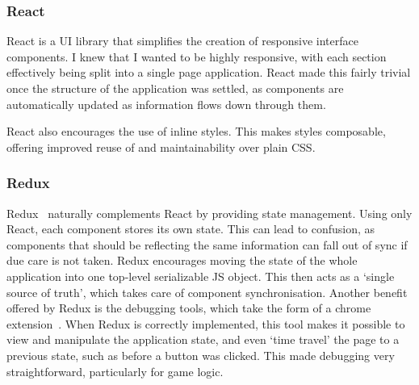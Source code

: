 \subsubsection{React}
React\cite{React} is a UI library that simplifies the creation of responsive interface components. I knew that I wanted \od{} to be highly responsive, with each section effectively being split into a single page application. React made this fairly trivial once the structure of the application was settled, as components are automatically updated as information flows down through them.

React also encourages the use of inline styles. This makes styles composable, offering improved reuse of and maintainability over plain CSS.

\subsubsection{Redux}
Redux~\cite{Redux} naturally complements React by providing state management. Using only React, each component stores its own state. This can lead to confusion, as components that should be reflecting the same information can fall out of sync if due care is not taken. Redux encourages moving the state of the whole application into one top-level serializable JS object. This then acts as a `single source of truth', which takes care of component synchronisation. Another benefit offered by Redux is the debugging tools, which take the form of a chrome extension~\cite{ReduxDev}. When Redux is correctly implemented, this tool makes it possible to view and manipulate the application state, and even `time travel' the page to a previous state, such as before a button was clicked. This made debugging very straightforward, particularly for game logic.

